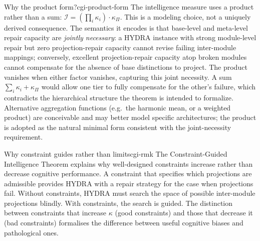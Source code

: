 \documentclass[12pt,twoside,openright]{book}
\begin{document}
\begin{remark}{Why the product form?}{cgi-product-form}
  The intelligence measure uses a product rather than a
  sum: $\mathcal{I} = (\prod_i \kappa_i) \cdot \kappa_\Pi$.
  This is a modeling choice, not a uniquely derived
  consequence. The semantics it encodes is that base-level
  and meta-level repair capacity are \emph{jointly
  necessary}: a HYDRA instance with strong module-level
  repair but zero projection-repair capacity cannot
  revise failing inter-module mappings; conversely,
  excellent projection-repair capacity atop broken
  modules cannot compensate for the absence of base
  distinctions to project. The product vanishes when
  either factor vanishes, capturing this joint necessity.
  A sum $\sum_i \kappa_i + \kappa_\Pi$ would allow one
  tier to fully compensate for the other's failure,
  which contradicts the hierarchical structure the
  theorem is intended to formalize. Alternative
  aggregation functions (e.g.\ the harmonic mean, or
  a weighted product) are conceivable and may better
  model specific architectures; the product is adopted
  as the natural minimal form consistent with the
  joint-necessity requirement.
\end{remark}

\begin{remark}{Why constraint guides rather than limits}{cgi-rmk}
  The Constraint-Guided Intelligence Theorem explains
  why well-designed constraints increase rather than
  decrease cognitive performance. A constraint that
  specifies which projections are admissible provides
  HYDRA with a repair strategy for the case when
  projections fail. Without constraints, HYDRA must
  search the space of possible inter-module projections
  blindly. With constraints, the search is guided.
  The distinction between constraints that increase
  $\kappa$ (good constraints) and those that decrease
  it (bad constraints) formalises the difference between
  useful cognitive biases and pathological ones.
\end{remark}
\end{document}
